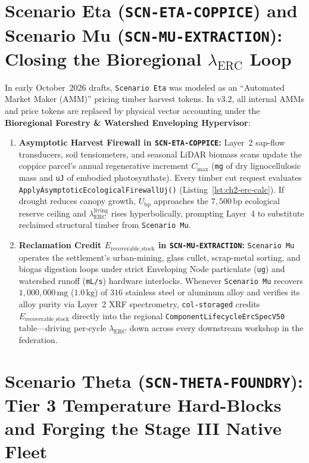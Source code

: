 \section{Scenario Eta (\texttt{SCN-ETA-COPPICE}) and Scenario Mu (\texttt{SCN-MU-EXTRACTION}): Closing the Bioregional $\lambda_{\mathrm{ERC}}$ Loop}
\label{sec:ch12-eta-mu}

In early October~2026 drafts, \texttt{Scenario Eta} was modeled as an ``Automated Market Maker (AMM)'' pricing timber harvest tokens. In v3.2, all internal AMMs and price tokens are replaced by physical vector accounting under the \textbf{Bioregional Forestry \& Watershed Enveloping Hypervisor}:
\begin{enumerate}
    \item \textbf{Asymptotic Harvest Firewall in \texttt{SCN-ETA-COPPICE}:} Layer~2 sap-flow transducers, soil tensiometers, and seasonal LiDAR biomass scans update the coppice parcel's annual regenerative increment $C_{\max}$ (\texttt{mg} of dry lignocellulosic mass and \texttt{uJ} of embodied photosynthate). Every timber cut request evaluates \texttt{ApplyAsymptoticEcologicalFirewallUj()} (Listing~\ref{lst:ch2-erc-calc}). If drought reduces canopy growth, $U_{\mathrm{bp}}$ approaches the $7{,}500\,\mathrm{bp}$ ecological reserve ceiling and $\lambda_{\mathrm{ERC}}^{\mathrm{living}}$ rises hyperbolically, prompting Layer~4 to substitute reclaimed structural timber from \texttt{Scenario Mu}.
    \item \textbf{Reclamation Credit $E_{\mathrm{recoverable\_stock}}$ in \texttt{SCN-MU-EXTRACTION}:} \texttt{Scenario Mu} operates the settlement's urban-mining, glass cullet, scrap-metal sorting, and biogas digestion loops under strict Enveloping Node particulate (\texttt{ug}) and watershed runoff (\texttt{mL/s}) hardware interlocks. Whenever \texttt{Scenario Mu} recovers $1{,}000{,}000\,\mathrm{mg}$ ($1.0\,\mathrm{kg}$) of $316$ stainless steel or aluminum alloy and verifies its alloy purity via Layer~2 XRF spectrometry, \texttt{col-storaged} credits $E_{\mathrm{recoverable\_stock}}$ directly into the regional \texttt{ComponentLifecycleErcSpecV50} table---driving per-cycle $\lambda_{\mathrm{ERC}}$ down across every downstream workshop in the federation.
\end{enumerate}

\section{Scenario Theta (\texttt{SCN-THETA-FOUNDRY}): Tier 3 Temperature Hard-Blocks and Forging the Stage III Native Fleet}
\label{sec:ch12-theta}

